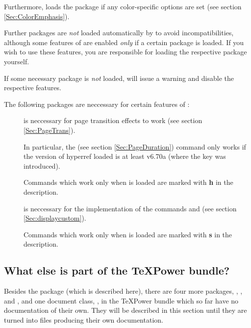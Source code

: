 \begin{slide}
Furthermore,  loads the package  if any color-specific options are set (see section
\ref{Sec:ColorEmphasis}).

Further packages are \emph{not} loaded automatically by  to avoid incompatibilities, although some
features of  are enabled \emph{only} if a certain package is loaded. If you wish to use these features,
you are responsible for loading the respective package yourself.

If some necessary package is \emph{not} loaded,  will issue a warning and disable the respective
features.

The following packages are neccessary for certain features of :
\begin{description}
\item[]
  is neccessary for page transition effects to work (see section
  \ref{Sec:PageTrans}).

  In particular, the  (see section \ref{Sec:PageDuration}) command only works if the version of
  hyperref loaded is at least v6.70a (where the  key was introduced).

  Commands which work only when  is loaded are marked with \textbf{\textsf{h}} in the description.

\newslide

\item[]
  is neccessary for the implementation of the commands  and
   (see section \ref{Sec:displaycustom}).

  Commands which work only when  is loaded are marked with \textbf{\textsf{s}} in the description.
\end{description}

\newslide

\subsection{What else is part of the \TeX Power bundle?}
Besides the package  (which is described here), there are four
more packages, , ,  and
, and one document class,
, in the \TeX Power bundle which so far have no documentation
of their own. They will be described in this section until they are turned
into  files producing their own documentation.


\end{slide}
